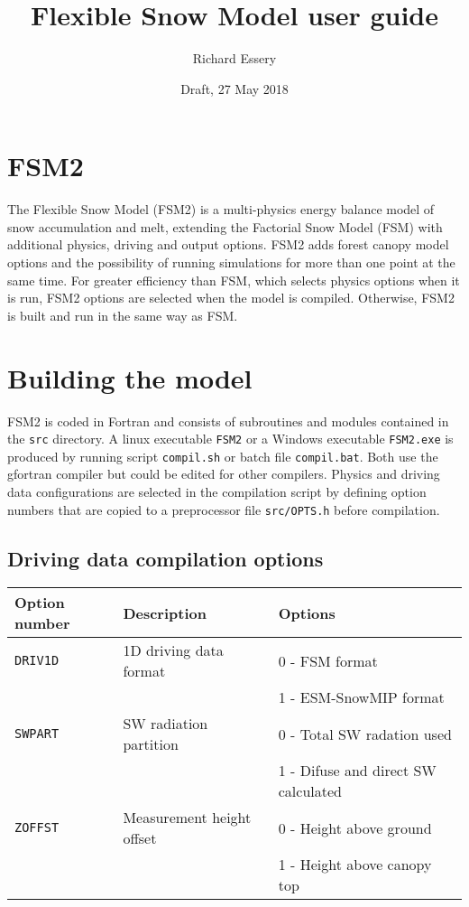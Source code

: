 \documentclass{article}
\title{Flexible Snow Model user guide}
\author{Richard Essery}
\date{Draft, 27 May 2018}
\begin{document}
\maketitle
\parindent0pt

\section{FSM2}

The Flexible Snow Model (FSM2) is a multi-physics energy balance model of snow accumulation and melt, extending the Factorial Snow Model (FSM) with additional physics, driving and output options. FSM2 adds forest canopy model options and the possibility of running simulations for more than one point at the same time. For greater efficiency than FSM, which selects physics options when it is run, FSM2 options are selected when the model is compiled. Otherwise, FSM2 is built and run in the same way as FSM.

\section{Building the model}

FSM2 is coded in Fortran and consists of subroutines and modules contained in the {\tt src} directory. A linux executable {\tt FSM2} or a Windows executable {\tt FSM2.exe} is produced by running script {\tt compil.sh} or batch file {\tt compil.bat}. Both use the gfortran compiler but could be edited for other compilers. Physics and driving data configurations are selected in the compilation script by defining option numbers that are copied to a preprocessor file {\tt src/OPTS.h} before compilation.

\subsection*{Driving data compilation options }
\begin{tabular}{|l|l|l|}
\hline
Option number & Description & Options \\
\hline
{\tt DRIV1D} & 1D driving data format
& 0 - FSM format \\
& & 1 - ESM-SnowMIP format \\
\hline
{\tt SWPART} & SW radiation partition
& 0 - Total SW radation used \\
& & 1 - Difuse and direct SW calculated \\
\hline
{\tt ZOFFST} & Measurement height offset
& 0 - Height above ground \\
& & 1 - Height above canopy top \\
\hline
\end{tabular}
\end{document}
